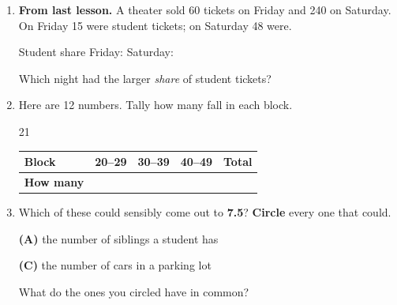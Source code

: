 \documentclass[12pt]{article}
\begin{document}

\vspace{0.28in}

\begin{enumerate}[leftmargin=1.9em, itemsep=0.80in]

  \item \textbf{From last lesson.} A theater sold 60 tickets on Friday and 240 on Saturday.
        On Friday 15 were student tickets; on Saturday 48 were.

        \vspace{12pt}
        Student share Friday:  \qquad Saturday: 
        \vspace{16pt}

        Which night had the larger \emph{share} of student tickets? 

  \item Here are 12 numbers. Tally how many fall in each block.

        \vspace{12pt}
        \begin{center}
        21           
        \end{center}
        \vspace{12pt}

        \renewcommand{\arraystretch}{1.5}
        \begin{tabularx}{\linewidth}{@{} l Y Y Y Y @{}}
        \textbf{Block} & 20--29 & 30--39 & 40--49 & \textbf{Total} \\
        \hline
        \textbf{How many} &  &  &  &  \\
        \end{tabularx}

  \item Which of these could sensibly come out to \textbf{7.5}? \textbf{Circle} every one
        that could.
        \vspace{14pt}

        \hspace{1.0em}\textbf{(A)} the number of siblings a student has
        \hfill
        \hspace{1.0em}
        \vspace{14pt}

        \hspace{1.0em}\textbf{(C)} the number of cars in a parking lot
        \hfill
        \hspace{1.0em}
        \vspace{16pt}

        What do the ones you circled have in common?\\[18pt]
        \\[18pt]

\end{enumerate}
\end{document}
